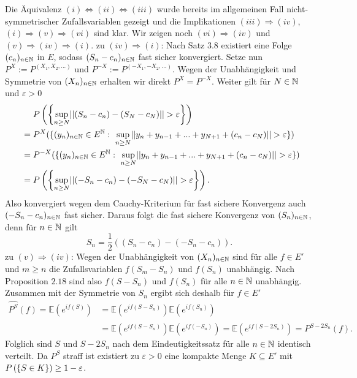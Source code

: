 \begin{proof*}
    Die Äquivalenz $(i) \iff (ii) \iff (iii)$ wurde bereits im allgemeinen Fall nicht-symmetrischer Zufallsvariablen gezeigt und die Implikationen $(iii) \Rightarrow (iv)$, $(i) \Rightarrow (v) \Rightarrow (vi)$ sind klar. 
    Wir zeigen noch $(vi) \Rightarrow (iv)$ und $(v) \Rightarrow (iv) \Rightarrow (i)$. 
    \newline
    zu $(iv) \Rightarrow (i)$:
    Nach Satz $3.8$ existiert eine Folge $(c_n)_{n \in \mathbb{N}}$ in $E$, sodass $(S_n - c_n)_{n \in \mathbb{N}}$ fast sicher konvergiert. Setze nun $P^X := P^{(X_1,X_2,...)}$ und $P^{-X} :=P^{(-X_1,-X_2,...)}$. 
    Wegen der Unabhängigkeit und Symmetrie von $(X_n)_{n \in \mathbb{N}}$ erhalten wir direkt $P^X = P^{-X}$. Weiter gilt für $N \in \mathbb{N}$ und $\varepsilon >0$
    \begin{align*}
        &\quad \ P\left(\left\{ \sup_{n \geq N}\lvert\lvert (S_n - c_n) - (S_N- c_N) \rvert\rvert > \varepsilon \right\}\right) \\\
                &= P^X(\{(y_n)_{n \in \mathbb{N}}\in E^{\mathbb{N}}: \  \sup_{n \geq N}\lvert\lvert y_n + y_{n-1} + ... + y_{N+1} + (c_n - c_N) \rvert\rvert > \varepsilon \}) \\\
                &= P^{-X}(\{(y_n)_{n \in \mathbb{N}}\in E^{\mathbb{N}}: \ \sup_{n \geq N}\lvert\lvert y_n + y_{n-1} + ... + y_{N+1} + (c_n - c_N) \rvert\rvert > \varepsilon \}) \\\
                &= P\left(\left\{ \sup_{n \geq N}\lvert\lvert (-S_n - c_n) - (-S_N - c_N) \rvert\rvert > \varepsilon \right\}\right).
    \end{align*}
    Also konvergiert wegen dem Cauchy-Kriterium für fast sichere Konvergenz auch $(-S_n - c_n)_{n \in \mathbb{N}}$ fast sicher. Daraus folgt die fast sichere Konvergenz von $(S_n)_{n \in \mathbb{N}}$, denn für $n \in \mathbb{N}$ gilt
    $$
       S_n =  \frac{1}{2}((S_n - c_n) - (-S_n -c_n)). 
    $$
    zu $(v) \Rightarrow (iv)$: Wegen der Unabhängigkeit von $(X_n)_{n \in \mathbb{N}}$ sind für alle $f \in E'$ und $m \geq n$ die Zufallsvariablen $f(S_m - S_n)$ und $f(S_n)$ unabhängig. 
    Nach Proposition $2.18$ sind also $f(S-S_n)$ und $f(S_n)$ für alle $n \in \mathbb{N}$ unabhängig. Zusammen mit der Symmetrie von $S_n$ ergibt sich deshalb für $f \in E'$
    \begin{align*}
        \widehat{P^S}(f) = \mathbb{E}(e^{if(S)}) &= \mathbb{E}(e^{if(S-S_n)})\mathbb{E}(e^{if(S_n)})  \\\
                                        &= \mathbb{E}(e^{if(S-S_n)})\mathbb{E}(e^{if(-S_n)}) = \mathbb{E}(e^{if(S-2S_n)}) = \widehat{P^{S-2S_n}}(f).
    \end{align*}
    Folglich sind $S$ und $S - 2S_n$ nach dem Eindeutigkeitssatz für alle $n \in \mathbb{N}$  identisch verteilt. Da $P^S$ straff ist existiert zu $\varepsilon >0$ eine kompakte Menge $K \subseteq E'$ mit $P\left(\left\{ S \in K \right\}\right) \geq 1 - \varepsilon$. 

\end{proof*}
